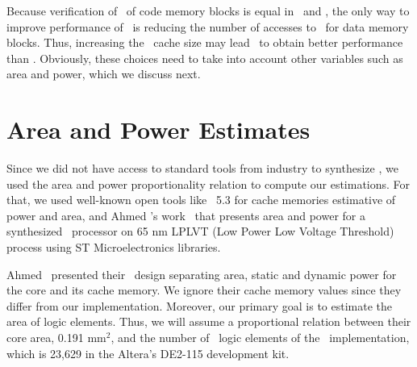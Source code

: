 Because verification of \ptags~of code memory blocks is equal in \timestamp~and \cshiamt, the only way to improve performance of \cshia~is reducing the number of accesses to \ptagmem~for data memory blocks. Thus, increasing the \ptag~cache size may lead \cshiamt~to obtain better performance than \timestamp. Obviously, these choices need to take into account other variables such as area and power, which we discuss next.

\section{Area and Power Estimates}
\label{subsec:Power-and-Area-Estimative}

Since we did not have access to standard tools from industry to synthesize \vhdl, we used the area and power proportionality relation \cite{Nemani1999:Area-Power} to compute our estimations. For that, we used well-known open tools like \cacti~5.3 \cite{HP:Cacti53} for cache memories estimative of power and area, and Ahmed \etal's work~\cite{Ahmed2009:Leon} that presents area and power for a synthesized \leon~processor on 65 nm LPLVT (Low Power Low Voltage Threshold) process using ST Microelectronics libraries.

Ahmed \etal~presented their \leon~design separating area, static and dynamic power for the core and its cache memory. We ignore their cache memory values since they differ from our implementation. Moreover, our primary goal is to estimate the area of logic elements. Thus, we will assume a proportional relation between their core area, 0.191 mm$^{2}$, and the number of \fpga~logic elements of the \baseline~implementation, which is 23,629 in the Altera's DE2-115 development kit. %

